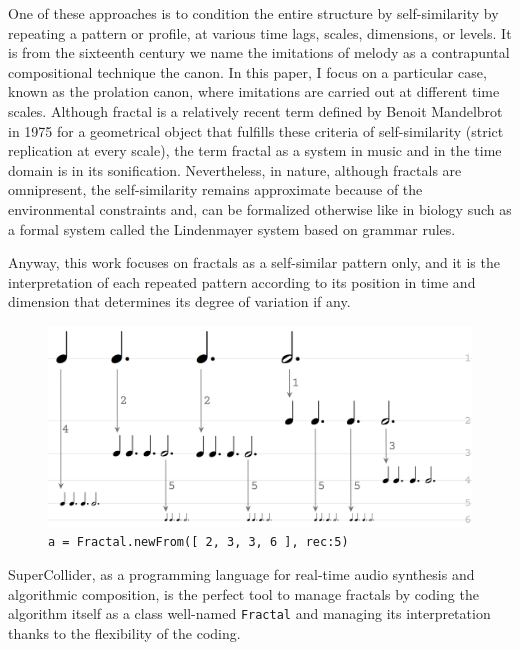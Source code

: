 \documentclass{article}
\begin{document}
One of these approaches is to condition the entire structure by self-similarity by repeating a pattern or profile, at various time lags, scales, dimensions, or levels.
It is from the sixteenth century we name the imitations of melody as a contrapuntal compositional technique the canon. In this paper, I focus on a particular case, known as the prolation canon, where imitations are carried out at different time scales\cite{fpm}. 
Although fractal is a relatively recent term defined by Benoit Mandelbrot in 1975\cite{bm} for a geometrical object that fulfills these criteria of self-similarity (strict replication at every scale), the term fractal as a system in music and in the time domain is in its sonification.
Nevertheless, in nature, although fractals are omnipresent, the self-similarity remains approximate because of the environmental constraints and, can be formalized otherwise like in biology such as a formal system called the Lindenmayer system based on grammar rules. 

Anyway, this work focuses on fractals as a self-similar pattern only, and it is the interpretation of each repeated pattern according to its position in time and dimension that determines its degree of variation if any. 

\begin{figure}[htbp]
\includegraphics[width=\textwidth]{img/fractal}
\caption{\texttt{a = Fractal.newFrom([ 2, 3, 3, 6 ], rec:5)}
}
\label{fractal}\vspace{-3mm}
\end{figure}

SuperCollider, as a programming language for real-time audio synthesis and algorithmic composition, is the perfect tool to manage fractals by coding the algorithm itself \cite[Section 6.3]{yx} as a class well-named \texttt{Fractal} \cite[\texttt{gsa.quark}]{yx} and managing its interpretation thanks to the flexibility of the coding. 
\end{document}
